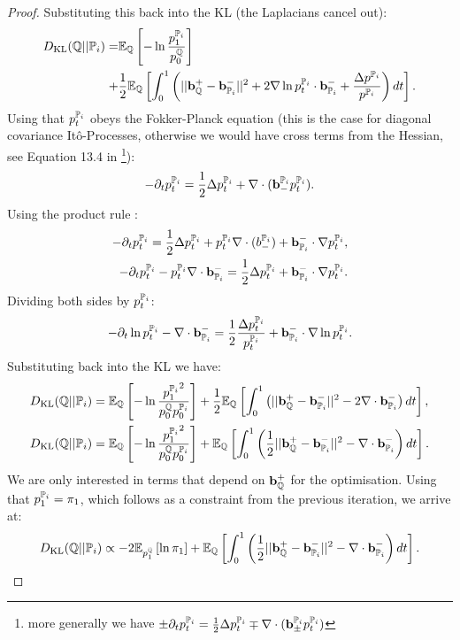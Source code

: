 \documentclass[a4paper,12pt,twoside,openright]{report}
\theoremstyle{definition}
\begin{document}
\begin{proof}
Substituting this back into the KL (the Laplacians cancel out):
\begin{align*}
\KL(\Q||{\P_{i}}) = &\E_\Q\left[-\log \frac{ p^{\P_{i}}_1}{ p^\Q_0}\right] \\+ &\frac{1}{2}\E_{\Q}\left[\int_0^1 \left(|| \rvb_\Q^{+} - \rvb_{\P_{i}}^{-}||^2 + 2\nabla\log p_t^{\P_{i}} \cdot \rvb_{\P_{i}}^{-}+ \frac{\Delta  p^{\P_{i}}}{ p^{\P_{i}}}\right)dt\right].
\end{align*}
Using that $ p_t^{\P_{i}}$ obeys the Fokker-Planck equation (this is the case for diagonal covariance Itô-Processes, otherwise we would have cross terms from the Hessian, see Equation 13.4 in \cite{nelson1967dynamical}\footnote{more generally we have $\pm\partial_t p_t^{\P_{i}} = \frac{1}{2}\Delta p_t^{\P_{i}}\mp\nabla\cdot(\rvb_\pm^{\P_{i}} p_t^{\P_{i}})$}): 
\begin{align*}
-\partial_t p_t^{\P_{i}} = \frac{1}{2}\Delta p_t^{\P_{i}}+\nabla\cdot(\rvb_{-}^{\P_{i}} p_t^{\P_{i}}).
\end{align*}
Using the product rule : 
\begin{align*}
-\partial_t p_t^{\P_{i}} = \frac{1}{2}\Delta p_t^{\P_{i}}+  p_t^{\P_{i}} \nabla\cdot(b_{-}^{\P_{i}}) + \rvb^{-}_{\P_{i}} \cdot \nabla p_t^{\P_{i}}, \\
-\partial_t p_t^{\P_{i}} -  p_t^{\P_{i}} \nabla\cdot \rvb^{-}_{\P_{i}}  = \frac{1}{2}\Delta p_t^{\P_{i}}+ \rvb^{-}_{\P_{i}} \cdot\nabla  p_t^{\P_{i}}.
\end{align*}
Dividing both sides by $ p_t^{\P_{i}}$:
\begin{align*}
-\partial_t \log  p_t^{\P_{i}} - \nabla\cdot \rvb^{-}_{\P_{i}}  = \frac{1}{2}\frac{\Delta  p_t^{\P_{i}}}{ p_t^{\P_{i}}}+  \rvb^{-}_{\P_{i}} \cdot \nabla \log  p_t^{\P_{i}}.
\end{align*}
Substituting back into the KL we have:
\begin{align*}
\KL(\Q||{\P_{i}}) &= \E_\Q\left[-\log \frac{{ p^{\P_{i}}_1}^2}{ p^\Q_0  p_0^{{\P_{i}}}}\right] + \frac{1}{2}\E_{\Q}\left[\int_0^1 \left(|| \rvb_\Q^{+} - \rvb_{\P_{i}}^{-}||^2 - 2\nabla\cdot \rvb^{-}_{\P_{i}} \right)dt\right], \\
\KL(\Q||{\P_{i}}) &= \E_\Q\left[-\log \frac{{ p^{\P_{i}}_1}^2}{ p^\Q_0   p_0^{{\P_{i}}}}\right] + \E_{\Q}\left[\int_0^1 \left(\frac{1}{2}|| \rvb_\Q^{+} - \rvb_{\P_{i}}^{-}||^2 - \nabla\cdot \rvb^{-}_{\P_{i}} \right)dt\right].
\end{align*}
We are only interested in terms that depend on $\rvb^{+}_\Q$ for the optimisation. Using that $p^{\P_{i}}_1=\pi_1$, which follows as a constraint from the previous iteration, we arrive at:
\begin{align}
\KL(\Q||{\P_{i}}) \propto -2\E_{ p^\Q_1}\left[\log {{ \pi_1 }} \right] + \E_{\Q}\left[\int_0^1 \left(\frac{1}{2}|| \rvb_\Q^{+} - \rvb_{\P_{i}}^{-}||^2 - \nabla\cdot \rvb^{-}_{\P_{i}} \right)dt\right].
\end{align}
\end{proof}
\end{document}
